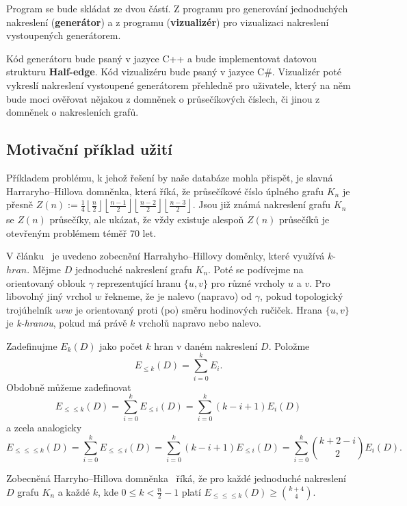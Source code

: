 \documentclass{article}
\begin{document}
Program se bude skládat ze dvou částí. Z programu pro generování jednoduchých nakreslení (\textbf{generátor}) a z programu (\textbf{vizualizér}) pro vizualizaci nakreslení vystoupených generátorem.

Kód generátoru bude psaný v jazyce C++ a bude implementovat datovou strukturu \textbf{Half-edge}. 
Kód vizualizéru bude psaný v jazyce C\#. Vizualizér poté vykreslí nakreslení vystoupené generátorem přehledně pro uživatele, který na něm bude moci ověřovat nějakou z domněnek o průsečíkových číslech, či jinou z domněnek o nakresleních grafů.

\subsection{Motivační příklad užití}

Příkladem problému, k jehož řešení by naše databáze mohla přispět, je slavná Harraryho--Hillova domněnka, která říká, že průsečíkové číslo úplného grafu $K_n$ je přesně $Z\left( n\right) :=\frac{1}{4}\left\lfloor \frac{n}{2}\right\rfloor \left\lfloor \frac{n-1}{2}\right\rfloor \left\lfloor \frac{n-2}{2}\right\rfloor \left\lfloor \frac{n-3}{2}\right\rfloor$. Jsou již známá nakreslení grafu $K_n$ se $Z(n)$ průsečíky, ale ukázat, že vždy existuje alespoň $Z(n)$ průsečíků je otevřeným problémem téměř 70 let.

V článku~\cite{monotone} je uvedeno zobecnění Harrahyho--Hillovy doměnky, které využívá $k$-$hran$.
Mějme $D$ jednoduché nakreslení grafu $K_n$. Poté se podívejme na orientovaný oblouk $\gamma$ reprezentující hranu $\{u, v\}$ pro různé vrcholy $u$ a $v$. Pro libovolný jiný vrchol $w$ řekneme, že je nalevo (napravo) od $\gamma$, pokud topologický trojúhelník $uvw$ je orientovaný proti (po) směru hodinových ručiček.
Hrana $\{u, v\}$ je {\it k-hranou}, pokud má právě $k$ vrcholů napravo nebo nalevo.

Zadefinujme $E_k(D)$ jako počet $k$ hran v daném nakreslení $D$.
Položme \[E_{\leq k}(D) = \sum_{i = 0}^{k}E_i.\] Obdobně můžeme zadefinovat \[E_{\leq\leq k}(D) = \sum_{i = 0}^{k}E_{\leq i}(D) = \sum_{i = 0}^{k}(k-i+1)E_i(D)\] a zcela analogicky \[E_{\leq\leq\leq k}(D) = \sum_{i = 0}^{k}E_{\leq\leq i}(D) = \sum_{i = 0}^{k}(k-i+1)E_{\leq i}(D) = \sum_{i = 0}^{k}{k+2-i \choose 2}E_i(D).\]

Zobecněná Harryho--Hillova domněnka~\cite{monotone} říká, že pro každé jednoduché nakreslení $D$ grafu $K_n$ a každé $k$, kde $0 \leq k < \frac{n}{2} - 1$ platí $E_{\leq\leq\leq k}(D) \geq {k+4 \choose 4}$.  
\end{document}
